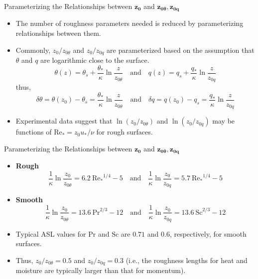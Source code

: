 \begin{frame}{Parameterizing the Relationships between $\mathbf{z_0}$ and $\mathbf{z_{0\theta},z_{0q}}$}

\begin{itemize}
	\item The number of roughness parameters needed is reduced by parameterizing relationships between them.
	\item Commonly, $z_0/z_{0\theta}$ and $z_0/z_{0q}$ are parameterized based on the assumption that $\theta$ and $q$ are logarithmic close to the surface.
	$$\theta(z) = \theta_s + \frac{\theta_*}{\kappa} \ln{\frac{z}{z_{0\theta}}} \quad \text{and} \quad q(z) =q_s + \frac{q_*}{\kappa} \ln{\frac{z}{z_{0q}}}$$
	thus,
	$$\delta \theta = \theta(z_0) - \theta_s = \frac{\theta_*}{\kappa} \ln{\frac{z}{z_{0\theta}}} \quad \text{and} \quad \delta q = q(z_0) - q_s = \frac{q_*}{\kappa} \ln{\frac{z}{z_{0q}}}$$
	\item Experimental data suggest that $\ln(z_0/z_{0\theta})$ and $\ln(z_0/z_{0q})$ may be functions of $\mathrm{Re_*} = z_0 u_*/\nu$ for rough surfaces.
\end{itemize}
\end{frame}
\begin{frame}{Parameterizing the Relationships between $\mathbf{z_0}$ and $\mathbf{z_{0\theta},z_{0q}}$}

\begin{itemize}
	\item \textbf{Rough}
	$$\frac{1}{\kappa}\ln{\frac{z_0}{z_{0\theta}}} = 6.2\ \mathrm{Re_*}^{1/4} - 5 \quad \text{and} \quad \frac{1}{\kappa}\ln{\frac{z_0}{z_{0q}}} = 5.7\ \mathrm{Re_*}^{1/4} - 5$$
	\item \textbf{Smooth}
	$$\frac{1}{\kappa}\ln{\frac{z_0}{z_{0\theta}}} = 13.6\ \mathrm{Pr}^{2/3} - 12 \quad \text{and} \quad \frac{1}{\kappa}\ln{\frac{z_0}{z_{0q}}} = 13.6\ \mathrm{Sc}^{2/3} - 12$$
	\item Typical ASL values for $\mathrm{Pr}$ and $\mathrm{Sc}$ are $0.71$ and $0.6$, respectively, for smooth surfaces.
	\item Thus, $z_0/z_{0\theta} = 0.5$ and $z_0/z_{0q} = 0.3$ (i.e., the roughness lengths for heat and moisture are typically larger than that for momentum).
\end{itemize}
\end{frame}



